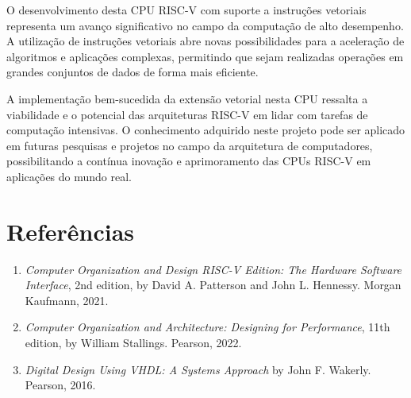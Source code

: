 \documentclass[12pt]{article}
\begin{document}
O desenvolvimento desta CPU RISC-V com suporte a instruções vetoriais representa um avanço significativo no campo da computação de alto desempenho. A utilização de instruções vetoriais abre novas possibilidades para a aceleração de algoritmos e aplicações complexas, permitindo que sejam realizadas operações em grandes conjuntos de dados de forma mais eficiente.

A implementação bem-sucedida da extensão vetorial nesta CPU ressalta a viabilidade e o potencial das arquiteturas RISC-V em lidar com tarefas de computação intensivas. O conhecimento adquirido neste projeto pode ser aplicado em futuras pesquisas e projetos no campo da arquitetura de computadores, possibilitando a contínua inovação e aprimoramento das CPUs RISC-V em aplicações do mundo real.

\section{Referências}

\begin{enumerate}
\item \textit{Computer Organization and Design RISC-V Edition: The Hardware Software Interface}, 2nd edition, by David A. Patterson and John L. Hennessy. Morgan Kaufmann, 2021.

\item \textit{Computer Organization and Architecture: Designing for Performance}, 11th edition, by William Stallings. Pearson, 2022.

\item \textit{Digital Design Using VHDL: A Systems Approach} by John F. Wakerly. Pearson, 2016.

\end{enumerate}
\end{document}
